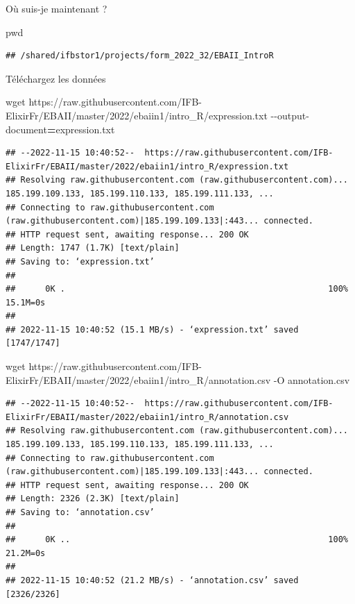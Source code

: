 \documentclass[
]{book}
\newenvironment{Shaded}{\begin{snugshade}}{\end{snugshade}}
\newcommand{\AttributeTok}[1]{\textcolor[rgb]{0.77,0.63,0.00}{#1}}
\newcommand{\BuiltInTok}[1]{#1}
\newcommand{\FunctionTok}[1]{\textcolor[rgb]{0.00,0.00,0.00}{#1}}
\newcommand{\NormalTok}[1]{#1}
\newcommand{\OperatorTok}[1]{\textcolor[rgb]{0.81,0.36,0.00}{\textbf{#1}}}
\begin{document}
Où suis-je maintenant ?

\begin{Shaded}
\begin{Highlighting}[]
\BuiltInTok{pwd}
\end{Highlighting}
\end{Shaded}

\begin{verbatim}
## /shared/ifbstor1/projects/form_2022_32/EBAII_IntroR
\end{verbatim}

Téléchargez les données

\begin{Shaded}
\begin{Highlighting}[]
\FunctionTok{wget}\NormalTok{ https://raw.githubusercontent.com/IFB{-}ElixirFr/EBAII/master/2022/ebaiin1/intro\_R/expression.txt }\AttributeTok{{-}{-}output{-}document}\OperatorTok{=}\NormalTok{expression.txt}
\end{Highlighting}
\end{Shaded}

\begin{verbatim}
## --2022-11-15 10:40:52--  https://raw.githubusercontent.com/IFB-ElixirFr/EBAII/master/2022/ebaiin1/intro_R/expression.txt
## Resolving raw.githubusercontent.com (raw.githubusercontent.com)... 185.199.109.133, 185.199.110.133, 185.199.111.133, ...
## Connecting to raw.githubusercontent.com (raw.githubusercontent.com)|185.199.109.133|:443... connected.
## HTTP request sent, awaiting response... 200 OK
## Length: 1747 (1.7K) [text/plain]
## Saving to: ‘expression.txt’
## 
##      0K .                                                     100% 15.1M=0s
## 
## 2022-11-15 10:40:52 (15.1 MB/s) - ‘expression.txt’ saved [1747/1747]
\end{verbatim}

\begin{Shaded}
\begin{Highlighting}[]
\FunctionTok{wget}\NormalTok{ https://raw.githubusercontent.com/IFB{-}ElixirFr/EBAII/master/2022/ebaiin1/intro\_R/annotation.csv }\AttributeTok{{-}O}\NormalTok{ annotation.csv}
\end{Highlighting}
\end{Shaded}

\begin{verbatim}
## --2022-11-15 10:40:52--  https://raw.githubusercontent.com/IFB-ElixirFr/EBAII/master/2022/ebaiin1/intro_R/annotation.csv
## Resolving raw.githubusercontent.com (raw.githubusercontent.com)... 185.199.109.133, 185.199.110.133, 185.199.111.133, ...
## Connecting to raw.githubusercontent.com (raw.githubusercontent.com)|185.199.109.133|:443... connected.
## HTTP request sent, awaiting response... 200 OK
## Length: 2326 (2.3K) [text/plain]
## Saving to: ‘annotation.csv’
## 
##      0K ..                                                    100% 21.2M=0s
## 
## 2022-11-15 10:40:52 (21.2 MB/s) - ‘annotation.csv’ saved [2326/2326]
\end{verbatim}
\end{document}
